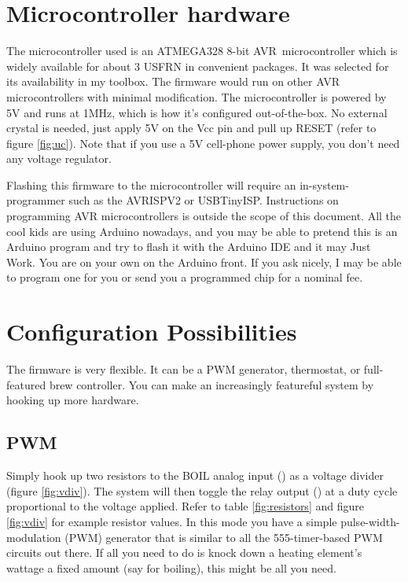 \documentclass[dvips,12pt]{article}
\begin{document}
\section{Microcontroller hardware}

The microcontroller used is an ATMEGA328 8-bit AVR\textcopyright\ microcontroller which is widely available for about 3 USFRN in convenient packages. It was selected for its availability in my toolbox. The firmware would run on other AVR microcontrollers with minimal modification. The microcontroller is powered by 5V and runs at 1MHz, which is how it's configured out-of-the-box.  No external crystal is needed, just apply 5V on the Vcc pin and pull up RESET (refer to figure \ref{fig:uc}). Note that if you use a 5V cell-phone power supply, you don't need any voltage regulator.

Flashing this firmware to the microcontroller will require an in-system-programmer such as the AVRISPV2 or USBTinyISP.  Instructions on programming AVR microcontrollers is outside the scope of this document. All the cool kids are using Arduino nowadays, and you may be able to pretend this is an Arduino program and try to flash it with the Arduino IDE and it may Just Work. You are on your own on the Arduino front. If you ask nicely, I may be able to program one for you or send you a programmed chip for a nominal fee.


\section{Configuration Possibilities}

The firmware is very flexible. It can be a PWM generator, thermostat, or full-featured brew controller. You can make an increasingly featureful system by hooking up more hardware. 

\subsection{PWM}
Simply hook up two resistors to the BOIL analog input (\duty) as a voltage divider (figure
\ref{fig:vdiv}). The system will then toggle the relay output (\relay{}) at a duty cycle
proportional to the voltage applied. Refer to table \ref{fig:resistors} and figure
\ref{fig:vdiv} for example resistor values. In this mode you have a simple pulse-width-modulation (PWM)
generator that is similar to all the 555-timer-based PWM circuits out there. If all you need to do is knock down a heating element's wattage a fixed amount (say for boiling), this might be all you need.  
\end{document}
